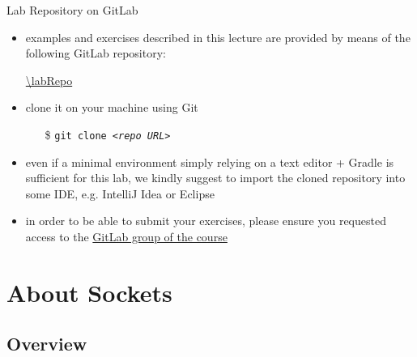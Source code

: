 \documentclass[presentation]{beamer}\mode<presentation>{\usetheme{AMSBolognaFC}}
\begin{document}
\begin{frame}[c]{Lab \labN{} Repository on GitLab}

	\begin{itemize}
		\item examples and exercises described in this lecture are provided by means of the following GitLab repository:
		\begin{center}
			\url{\labRepo}
		\end{center}

		\vfill

		\item clone it on your machine using Git
		\begin{itemize}
		    \item[\$] \texttt{git clone \textit{<repo URL>}}
		\end{itemize}

		\vfill

		\item even if a minimal environment simply relying on a text editor + Gradle is sufficient for this lab, we kindly suggest to import the cloned repository into some IDE, e.g. IntelliJ Idea or Eclipse

		\vfill

		\item in order to be able to submit your exercises, please ensure you requested access to the \href{\gitlabGroup}{GitLab group of the course}
	\end{itemize}

\end{frame}

\section{About Sockets}

\subsection{Overview}
\end{document}
